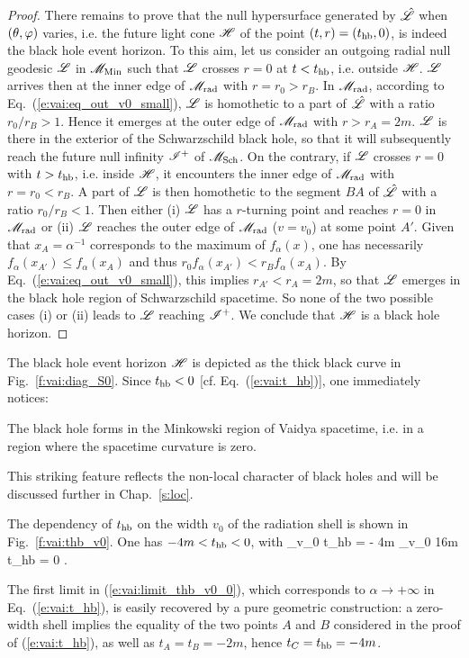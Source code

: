 \begin{proof}
There remains to prove that the null hypersurface generated by
$\hat{\mathscr{L}}$ when $(\theta,\varphi)$ varies, i.e. the future light cone $\mathscr{H}$
of the point $(t, r) = (t_{\rm hb}, 0)$, is indeed the black hole event
horizon. To this aim, let us consider an outgoing radial null geodesic $\mathscr{L}$
in $\mathscr{M}_{\rm Min}$ such that $\mathscr{L}$ crosses $r=0$ at $t < t_{\rm hb}$,
i.e. outside $\mathscr{H}$.
$\mathscr{L}$ arrives then at the inner edge of $\mathscr{M}_{\rm rad}$
with $r = r_0 > r_B$.  In $\mathscr{M}_{\rm rad}$,
according to Eq.~(\ref{e:vai:eq_out_v0_small}),
$\mathscr{L}$ is homothetic to a part of $\hat{\mathscr{L}}$ with a ratio $r_0 / r_B > 1$. Hence it emerges
at the outer edge of $\mathscr{M}_{\rm rad}$ with $r > r_A = 2 m$. $\mathscr{L}$ is
there in the exterior of the Schwarzschild black hole, so that it will subsequently reach
the future null infinity $\mathscr{I}^+$ of $\mathscr{M}_{\rm Sch}$.
On the contrary, if $\mathscr{L}$ crosses $r=0$ with $t > t_{\rm hb}$,
i.e. inside $\mathscr{H}$,
it encounters the inner edge of $\mathscr{M}_{\rm rad}$ with
$r = r_0 < r_B$. A part of $\mathscr{L}$ is then homothetic to the segment $BA$ of
$\hat{\mathscr{L}}$ with a ratio $r_0 / r_B < 1$. Then either (i) $\mathscr{L}$ has a
$r$-turning point and reaches $r=0$
in $\mathscr{M}_{\rm rad}$ or (ii) $\mathscr{L}$ reaches
the outer edge of $\mathscr{M}_{\rm rad}$ ($v = v_0$) at some point $A'$.
Given that $x_A = \alpha^{-1}$ corresponds to the maximum of $f_\alpha(x)$, one
has necessarily $f_\alpha(x_{A'}) \leq f_\alpha(x_A)$ and thus
$r_0 f_\alpha(x_{A'}) < r_B f_\alpha(x_A)$. By
Eq.~(\ref{e:vai:eq_out_v0_small}), this implies $r_{A'} < r_A = 2m$, so
that $\mathscr{L}$ emerges in the black hole region of Schwarzschild spacetime.
So none of the two possible cases (i) or (ii) leads to $\mathscr{L}$ reaching
$\mathscr{I}^+$. We conclude that $\mathscr{H}$ is a black hole
horizon.
\end{proof}

The black hole event horizon $\mathscr{H}$ is depicted as the thick black curve
in Fig.~\ref{f:vai:diag_S0}. Since $t_{\rm hb} < 0$ [cf. Eq.~(\ref{e:vai:t_hb})],
one immediately notices:
\begin{prop}
The black hole forms in the Minkowski
region of Vaidya spacetime, i.e. in a region where the spacetime curvature
is zero.
\end{prop}
This striking feature reflects the non-local character of black holes and
will be discussed further in Chap.~\ref{s:loc}.

The dependency of $t_{\rm hb}$
on the width $v_0$ of the radiation shell is shown in Fig.~\ref{f:vai:thb_v0}.
One has $-4m < t_{\rm hb} < 0$, with
\be \label{e:vai:limit_thb_v0_0}
    \lim_{v_0 } t_{\rm hb} = - 4m \qand
     \lim_{v_0 \to 16m} t_{\rm hb} = 0 .
\ee
\begin{remark}
The first limit in (\ref{e:vai:limit_thb_v0_0}), which corresponds to $\alpha\to +\infty$ in Eq.~(\ref{e:vai:t_hb}),
is easily recovered by a pure geometric construction: a zero-width
shell implies the equality of the two points $A$ and $B$ considered in the
proof of (\ref{e:vai:t_hb}), as well as $t_A = t_B = - 2m$, hence
$t_C = t_{\rm hb} = - 4 m$.
\end{remark}

